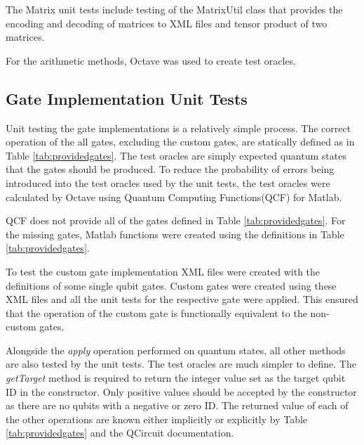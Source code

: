 The Matrix unit tests include testing of the MatrixUtil class that provides the encoding and decoding of matrices to XML files and tensor product of two matrices.

For the arithmetic methods, Octave\cite{octweb} was used to create test oracles.

\subsection{Gate Implementation Unit Tests}
\label{sec:gatetests}
Unit testing the gate implementations is a relatively simple process.
The correct operation of the all gates, excluding the custom gates, are statically defined as in Table \ref{tab:providedgates}.
The test oracles are simply expected quantum states that the gates should be produced.
To reduce the probability of errors being introduced into the test oracles used by the unit tests, the test oracles were calculated by Octave\cite{octweb} using Quantum Computing Functions(QCF) for Matlab\cite{qcfweb}.

QCF does not provide all of the gates defined in Table \ref{tab:providedgates}.
For the missing gates, Matlab functions were created using the definitions in Table \ref{tab:providedgates}.

To test the custom gate implementation XML files were created with the definitions of some single qubit gates.
Custom gates were created using these XML files and all the unit tests for the respective gate were applied.
This ensured that the operation of the custom gate is functionally equivalent to the non-custom gates.

Alongside the \emph{apply} operation performed on quantum states, all other methods are also tested by the unit tests.
The test oracles are much simpler to define.
The \emph{getTarget} method is required to return the integer value set as the target qubit ID in the constructor.
Only positive values should be accepted by the constructor as there are no qubits with a negative or zero ID.
The returned value of each of the other operations are known either implicitly or explicitly by Table \ref{tab:providedgates} and the QCircuit\cite{QCsite} documentation.

